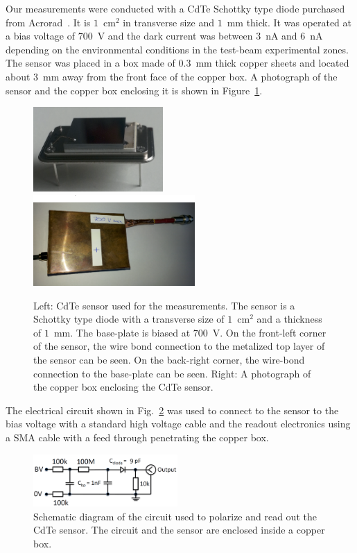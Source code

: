 %
Our measurements were conducted with a CdTe Schottky type diode purchased from 
Acrorad~\cite{acrorad}. It is $1$~$\mathrm{cm}^{2}$ in transverse size and $1$~mm thick.
It was operated at a bias voltage of $700$~V and the dark current was between $3$~nA 
and $6$~nA depending on the environmental conditions in the test-beam experimental 
zones. The sensor was placed in a box made of $0.3$~mm thick copper sheets and located
about $3$~mm away from the front face of the copper box.
A photograph of the sensor and the copper box enclosing it is shown in 
Figure~\ref{fig:CdTeSensor}.

%
\begin{figure}[htbp] 
\centering
\includegraphics[width=0.44\textwidth]{figures/CdTeSensor.png} 
\includegraphics[width=0.55\textwidth]{figures/CdTeSensorBox.png} 
\caption{Left: CdTe sensor used for the measurements. The sensor is a Schottky type diode with a transverse size 
of $1$~$\mathrm{cm}^{2}$ and a thickness of $1$~mm. The base-plate is biased at $700$~V. 
On the front-left corner of the sensor, the wire bond connection
to the metalized top layer of the sensor can be seen. On the back-right corner,
the wire-bond connection to the base-plate can be seen. 
Right: A photograph of the copper box enclosing the CdTe sensor. } 
\label{fig:CdTeSensor} 
\end{figure} 
%
The electrical circuit shown in Fig.~\ref{fig:cdtecircuit} was used to connect to the sensor to the bias 
voltage with a standard high voltage cable and the readout electronics using a SMA cable with a feed 
through penetrating the copper box.

%
\begin{figure}[htbp] 
\centering
\includegraphics[width=0.49\textwidth]{figures/circuit_CdTe.png} 
\caption{Schematic diagram of the circuit used to polarize and read out the 
CdTe sensor. The circuit and the sensor are enclosed inside a copper box. }
\label{fig:cdtecircuit} 
\end{figure} 
%

